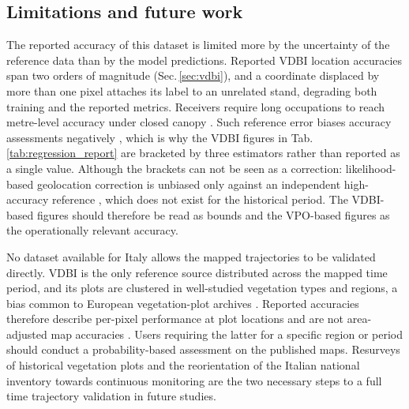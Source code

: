 \documentclass[essd, manuscript]{copernicus}
\begin{document}
\subsection{Limitations and future work}
\label{sec:limitations}

The reported accuracy of this dataset is limited more by the uncertainty of the reference data than by the model predictions. Reported VDBI location accuracies span two orders of magnitude (Sec.\,\ref{sec:vdbi}), and a coordinate displaced by more than one pixel attaches its label to an unrelated stand, degrading both training and the reported metrics. Receivers require long occupations to reach metre-level accuracy under closed canopy \citep{strunk_examination_2025}. Such reference error biases accuracy assessments negatively \citep{elmes_accounting_2020,persson_quantify_2022}, which is why the VDBI figures in Tab.\,\ref{tab:regression_report} are bracketed by three estimators rather than reported as a single value. Although the brackets can not be seen as a correction: likelihood-based geolocation correction is unbiased only against an independent high-accuracy reference \citep{shannon_quantifying_2024}, which does not exist for the historical period. The VDBI-based figures should therefore be read as bounds and the VPO-based figures as the operationally relevant accuracy.

No dataset available for Italy allows the mapped trajectories to be validated directly. VDBI is the only reference source distributed across the mapped time period, and its plots are clustered in well-studied vegetation types and regions, a bias common to European vegetation-plot archives \citep{chytry_european_2016, sabatini_splotopen_2021}. Reported accuracies therefore describe per-pixel performance at plot locations and are not area-adjusted map accuracies \citep{olofsson_good_2014}. Users requiring the latter for a specific region or period should conduct a probability-based assessment on the published maps. Resurveys of historical vegetation plots \citep{kapfer_resurveying_2017, verheyen_combining_2017, midolo_sixty_2026} and the reorientation of the Italian national inventory towards continuous monitoring \citep{damico_national_2025} are the two necessary steps to a full time trajectory validation in future studies.
\end{document}
